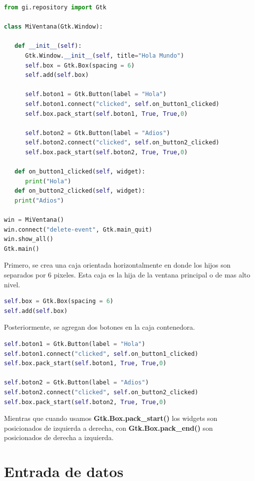 \documentclass[12pt, twoside]{report}
\begin{document}
\begin{lstlisting}[language=Python]
from gi.repository import Gtk

class MiVentana(Gtk.Window):

   def __init__(self):
      Gtk.Window.__init__(self, title="Hola Mundo")
      self.box = Gtk.Box(spacing = 6)
      self.add(self.box)
      
      self.boton1 = Gtk.Button(label = "Hola")
      self.boton1.connect("clicked", self.on_button1_clicked)
      self.box.pack_start(self.boton1, True, True,0)
      
      self.boton2 = Gtk.Button(label = "Adios")
      self.boton2.connect("clicked", self.on_button2_clicked)
      self.box.pack_start(self.boton2, True, True,0)
      
   def on_button1_clicked(self, widget):
      print("Hola")
   def on_button2_clicked(self, widget):
   print("Adios")

win = MiVentana()
win.connect("delete-event", Gtk.main_quit)
win.show_all()
Gtk.main()

\end{lstlisting}

Primero, se crea una caja orientada horizontalmente en donde los hijos son separados por 6 pixeles. Esta caja es la hija de la ventana principal o de mas alto nivel.

\begin{lstlisting}[language=Python]
self.box = Gtk.Box(spacing = 6)
self.add(self.box)
\end{lstlisting}

Posteriormente, se agregan dos botones en la caja contenedora.

\begin{lstlisting}[language=Python]
self.boton1 = Gtk.Button(label = "Hola")
self.boton1.connect("clicked", self.on_button1_clicked)
self.box.pack_start(self.boton1, True, True,0)
      
self.boton2 = Gtk.Button(label = "Adios")
self.boton2.connect("clicked", self.on_button2_clicked)
self.box.pack_start(self.boton2, True, True,0)

\end{lstlisting}

Mientras que cuando usamos\textbf{ Gtk.Box.pack\_start()} los widgets son posicionados de izquierda a derecha, con  \textbf{Gtk.Box.pack\_end()} son posicionados de derecha a izquierda.

\section{Entrada de datos}
\end{document}

